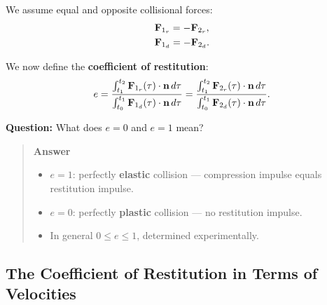 \documentclass[
  letterpaper,
  DIV=11,
  numbers=noendperiod]{scrreprt}
\providecommand{\tightlist}{%
  \setlength{\itemsep}{0pt}\setlength{\parskip}{0pt}}
\begin{document}
We assume equal and opposite collisional forces: \begin{align}
    \begin{split}
        & {\bf F}_{1_r} = -{\bf F}_{2_r},\\
        & {\bf F}_{1_d} = -{\bf F}_{2_d}.
    \end{split}
\end{align}

We now define the \textbf{coefficient of restitution}: \begin{align}
    e = \frac{\int_{t_1}^{t_2}{\bf F}_{1_r}(\tau)\cdot{\bf n}\,d\tau}{\int_{t_0}^{t_1}{\bf F}_{1_d}(\tau)\cdot{\bf n}\,d\tau} = \frac{\int_{t_1}^{t_2}{\bf F}_{2_r}(\tau)\cdot{\bf n}\,d\tau}{\int_{t_0}^{t_1}{\bf F}_{2_d}(\tau)\cdot{\bf n}\,d\tau}.
\end{align}

\begin{tcolorbox}[enhanced jigsaw, arc=.35mm, bottomrule=.15mm, bottomtitle=1mm, breakable, colback=white, colbacktitle=quarto-callout-tip-color!10!white, colframe=quarto-callout-tip-color-frame, coltitle=black, left=2mm, leftrule=.75mm, opacityback=0, opacitybacktitle=0.6, rightrule=.15mm, title=\textcolor{quarto-callout-tip-color}{\faLightbulb}\hspace{0.5em}{Think!}, titlerule=0mm, toprule=.15mm, toptitle=1mm]

\textbf{Question:} What does \(e=0\) and \(e=1\) mean?

\begin{quote}
\textbf{Answer}

\begin{itemize}
\tightlist
\item
  \(e=1\): perfectly \textbf{elastic} collision --- compression impulse
  equals restitution impulse.
\item
  \(e=0\): perfectly \textbf{plastic} collision --- no restitution
  impulse.
\item
  In general \(0\leq e\leq 1\), determined experimentally.
\end{itemize}
\end{quote}

\end{tcolorbox}

\subsection{The Coefficient of Restitution in Terms of
Velocities}\label{the-coefficient-of-restitution-in-terms-of-velocities}
\end{document}
